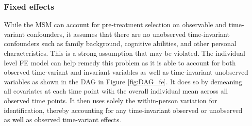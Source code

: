 \subsubsection*{Fixed effects}

While the \ac{MSM} can account for pre-treatment selection on observable and time-variant confounders, it assumes that there are no unobserved time-invariant confounders such as family background, cognitive abilities, and other personal characteristics. This is a strong assumption that may be violated. The individual level \ac{FE} model can help remedy this problem as it is able to account for both observed time-variant and invariant variables as well as time-invariant unobserved variables as shown in the \ac{DAG} in Figure \ref{fig:DAG_fe}. It does so by demeaning all covariates at each time point with the overall individual mean across all observed time points. It then uses solely the within-person variation for identification, thereby accounting for any time-invariant observed or unobserved as well as observed time-variant effects. 


